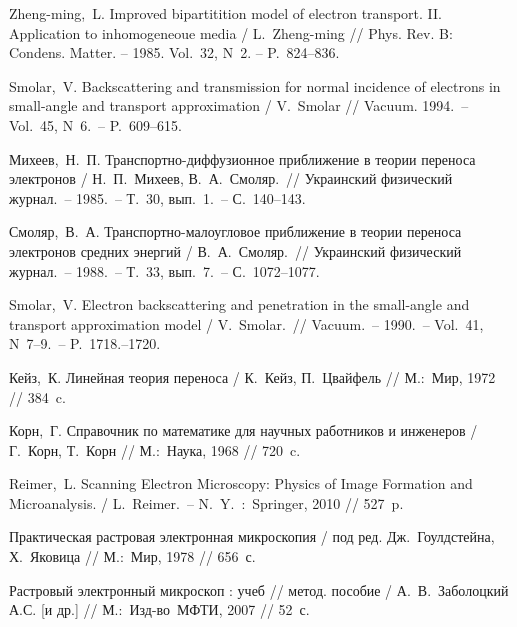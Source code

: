 \def\bibname{СПИСОК ИСПОЛЬЗОВАННЫХ ИСТОЧНИКОВ}
\begin{thebibliography}{99}
\newcommand{\tabfix}{\hspace*{1.25cm}}
 \tabfix Zheng-ming,~L. Improved bipartitition model of electron
transport. II. Application to inhomogeneoue media / L.~Zheng-ming // Phys. Rev. B:
Condens. Matter. -- 1985. Vol.~32, N~2. -- P.~824--836.

 \tabfix Smolar,~V. Backscattering and transmission for normal
incidence of electrons in small-angle and transport approximation /
V.~Smolar // Vacuum. 1994.~-- Vol.~45, N~6.~-- P.~609--615.

 \tabfix Михеев,~Н.~П. Транспортно-диффузионное приближение в теории
переноса электронов / Н.~П.~Михеев, В.~А.~Смоляр.~// Украинский физический
журнал.~-- 1985.~-- Т.~30, вып.~1.~-- С.~140--143.

 \tabfix Смоляр,~В.~А. Транспортно-малоугловое приближение в теории
переноса электронов средних энергий / В.~А.~Смоляр.~// Украинский физический
журнал.~-- 1988.~-- Т.~33, вып.~7.~-- С.~1072--1077.

 \tabfix Smolar,~V. Electron backscattering and penetration in the
small-angle and transport approximation model / V.~Smolar.~// Vacuum.~-- 1990.~--
Vol.~41, N~7--9.~-- P.~1718.--1720.

 \tabfix Кейз,~К. Линейная теория переноса / К.~Кейз, П.~Цвайфель //
М.:~Мир, 1972 // 384~c.

 \tabfix Корн,~Г. Справочник по математике для научных работников и
инженеров /  Г.~Корн, Т.~Корн // М.:~Наука, 1968 // 720~c.



 \tabfix Reimer,~L. Scanning Electron Microscopy: Physics of Image Formation
and Microanalysis. / L.~Reimer.~-- N.~Y.~:~Springer, 2010 // 527~p.

 \tabfix Практическая растровая электронная микроскопия / под ред.
Дж.~Гоулдстейна, Х.~Яковица // М.:~Мир, 1978 // 656~с.

 \tabfix Растровый электронный микроскоп : учеб // метод. пособие /
А.~В.~Заболоцкий А.С. [и др.] // М.:~Изд-во~МФТИ, 2007 //
52~с. %


\end{thebibliography}
